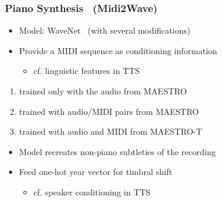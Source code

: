 \documentclass[dvipdfmx]{beamer}
\begin{document}
\begin{frame}
    \frametitle{Piano Synthesis \ (Midi2Wave)}
    \begin{itemize}
        \item Model: WaveNet \cite{wavenet} \ {\small (with several modifications)}
        \item Provide a MIDI sequence as conditioning information
        \begin{itemize}
            \item cf. linguistic features in TTS
        \end{itemize}
    \end{itemize}
    \begin{enumerate}
        \item {}
            trained only with the audio from MAESTRO
        \item {}
            trained with audio/MIDI pairs from MAESTRO
        \item {}
            trained with audio and MIDI from MAESTRO-T
    \end{enumerate}
    \begin{itemize}
        \item Model recreates non-piano subtleties of the recording
        \item Feed one-hot year vector for timbral shift
        \begin{itemize}
            \item cf. speaker conditioning in TTS
        \end{itemize}
    \end{itemize}
\end{frame}
\end{document}
